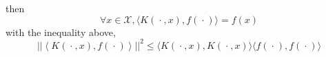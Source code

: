 \documentclass[12pt]{article}
\newcommand{\bdot}{~\bm{\cdot}~}
\newcommand{\la}{\langle}
\newcommand{\ra}{\rangle}
\begin{document}
then
\begin{equation}
    \forall x \in \mathcal{X}, \la K(\bdot, x), f(\bdot)\ra = f(x) 
\end{equation}
with the inequality above,
\begin{equation}
    ||\left\la K(\bdot, x), f(\bdot)\right\ra||^2 \leq \la K(\bdot, x), K(\bdot, x) \ra \la f(\bdot), f(\bdot) \ra
\end{equation}

\end{document}
